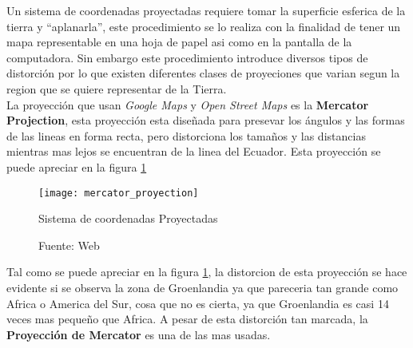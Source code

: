         Un sistema de coordenadas proyectadas requiere tomar la superficie esferica de la tierra y ``aplanarla'', este procedimiento se lo realiza con la finalidad de tener un mapa representable en una hoja de papel asi como en la pantalla de la computadora. Sin embargo este procedimiento introduce diversos tipos de distorci\'on por lo que existen diferentes clases de proyeciones que varian segun la region que se quiere representar de la Tierra.\\

        La proyecci\'on que usan \emph{Google Maps} y \emph{Open Street Maps} es la \textbf{Mercator Projection}\cite{gmaps_osm}, esta proyecci\'on esta dise\~nada para presevar los ángulos y las formas de las lineas en forma recta, pero distorciona los tama\~nos y las distancias mientras mas lejos se encuentran de la linea del Ecuador. Esta proyecci\'on se puede apreciar en la figura \ref{fig:mercator_proyection}


        \begin{figure}[H]
          \begin{center}
            \texttt{[image: mercator\_proyection]}
          \end{center}
          \caption{Sistema de coordenadas Proyectadas}
          \label{fig:mercator_proyection}
          \caption*{Fuente: Web}
        \end{figure}

        Tal como se puede apreciar en la figura \ref{fig:mercator_proyection}, la distorcion de esta proyecci\'on se hace evidente si se observa la zona de Groenlandia ya que pareceria tan grande como Africa o America del Sur, cosa que no es cierta, ya que Groenlandia es casi 14 veces mas peque\~no que Africa. A pesar de esta distorci\'on tan marcada, la \textbf{Proyección de Mercator} es una de las mas usadas.

